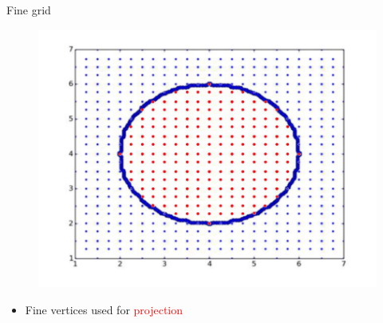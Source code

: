 \begin{frame}
\begin{overlayarea}{\textwidth}{0.9\textheight}
\begin{minipage}{0.45\textwidth}
	\begin{block}{\centering Fine grid}
	\vspace{-0.5cm}
	\begin{figure}
	\includegraphics[scale=0.35]{Pictures/DC/DC_1_Fine.pdf}
	\end{figure}
	\begin{itemize}
	\item Fine vertices used for \textcolor{red}{projection}
	\end{itemize}
	\end{block}
	\end{minipage}
\end{overlayarea}
\end{frame}




